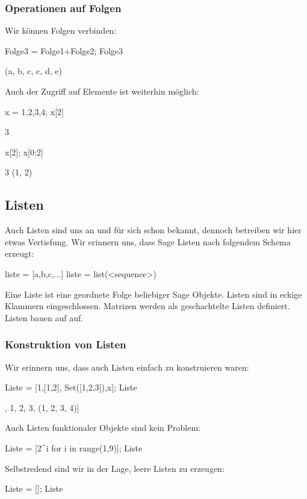 \documentclass[fontsize=12pt,paper=a4,twoside,bibtotoc,idxtotoc,
liststotoc,pagesize,BCOR1.2cm,DIV15,chapterprefix,pagesize=pdftex]{scrbook}
\theoremstyle{plain}
\theoremstyle{definition}
\theoremstyle{remark}
\begin{document}
\subsubsection{Operationen auf Folgen}
Wir können Folgen verbinden:
\begin{sagein}
Folge3 = Folge1+Folge2; Folge3
\end{sagein}
\begin{sageout}
(a, b, c, c, d, e)
\end{sageout}
Auch der Zugriff auf Elemente ist weiterhin möglich:
\begin{sagein}
x = 1,2,3,4; x[2] 
\end{sagein}
\begin{sageout}
  3
\end{sageout}
\begin{sagein}
x[2]; x[0:2]
\end{sagein}
\begin{sageout}
3
(1, 2)
\end{sageout}
\subsection{Listen}
Auch Listen sind uns an und für sich schon bekannt, dennoch betreiben wir hier etwas Vertiefung. Wir erinnern uns, dass Sage Listen nach folgendem Schema erzeugt:
\begin{sagein}
liste = [a,b,c,...] 
liste = list(<sequence>)
\end{sagein}
Eine Liste ist eine geordnete Folge beliebiger Sage Objekte. Listen sind in eckige Klammern eingeschlossen. Matrizen werden als geschachtelte Listen definiert. 
Listen bauen auf  auf. 
\subsubsection{Konstruktion von Listen}
Wir erinnern uns, dass auch Listen einfach zu konstruieren waren:
\begin{sagein}
Liste = [1,[1,2], Set([1,2,3]),x]; Liste
\end{sagein}
\begin{sageout}
[1, [1, 2], {1, 2, 3}, (1, 2, 3, 4)]
\end{sageout}
Auch Listen funktionaler Objekte sind kein Problem:
\begin{sagein}
Liste = [2^i for i in range(1,9)]; Liste
\end{sagein}
\begin{sageout}
[2, 4, 8, 16, 32, 64, 128, 256]
\end{sageout}
Selbstredend sind wir in der Lage, leere Listen zu erzeugen:
\begin{sagein}
Liste = []; Liste
\end{sagein}
\begin{sageout}
  []
\end{sageout}
\end{document}
